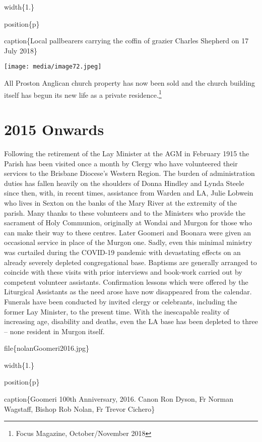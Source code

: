 width\{1.\}

position\{p\}

caption\{Local pallbearers carrying the coffin of grazier Charles Shepherd on 17 July 2018\}

\texttt{[image: media/image72.jpeg]}

All Proston Anglican church property has now been sold and the church building itself has begun its new life as a private residence.\footnote{Focus Magazine, October/November 2018}

\hypertarget{onwards}{%
\section{2015 Onwards}\label{onwards}}

Following the retirement of the Lay Minister at the AGM in February 1915 the Parish has been visited once a month by Clergy who have volunteered their services to the Brisbane Diocese's Western Region. The burden of administration duties has fallen heavily on the shoulders of Donna Hindley and Lynda Steele since then, with, in recent times, assistance from Warden and LA, Julie Lobwein who lives in Sexton on the banks of the Mary River at the extremity of the parish. Many thanks to these volunteers and to the Ministers who provide the sacrament of Holy Communion, originally at Wondai and Murgon for those who can make their way to these centres. Later Goomeri and Boonara were given an occasional service in place of the Murgon one. Sadly, even this minimal ministry was curtailed during the COVID-19 pandemic with devastating effects on an already severely depleted congregational base. Baptisms are generally arranged to coincide with these visits with prior interviews and book-work carried out by competent volunteer assistants. Confirmation lessons which were offered by the Liturgical Assistants as the need arose have now disappeared from the calendar. Funerals have been conducted by invited clergy or celebrants, including the former Lay Minister, to the present time. With the inescapable reality of increasing age, disability and deaths, even the LA base has been depleted to three -- none resident in Murgon itself.

file\{nolanGoomeri2016.jpg\}

width\{1.\}

position\{p\}

caption\{Goomeri 100th Anniversary, 2016. Canon Ron Dyson, Fr Norman Wagstaff, Bishop Rob Nolan, Fr Trevor Cichero\}

